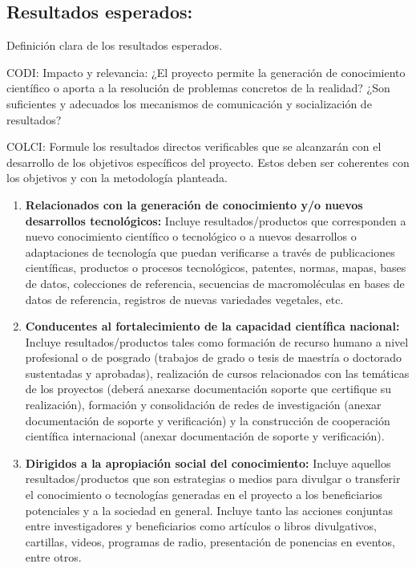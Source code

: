 \subsection{Resultados esperados:                          }
\begin{evaluacion}
  Definición clara de los resultados esperados.
\end{evaluacion}
\begin{instrucciones}
CODI:  Impacto y relevancia:
¿El proyecto permite la generación de conocimiento científico o aporta a la resolución de problemas concretos de la realidad? ¿Son suficientes y adecuados los mecanismos de comunicación y socialización de resultados? 

 COLCI: Formule los resultados directos verificables que se
alcanzarán con el desarrollo de los objetivos específicos del proyecto. Estos deben ser coherentes
con los objetivos y con la metodología planteada.



  \begin{enumerate}
  \item \textbf{Relacionados con la generación de conocimiento y/o nuevos desarrollos
 tecnológicos:} Incluye resultados/productos que corresponden a nuevo
 conocimiento científico o tecnológico o a nuevos desarrollos o adaptaciones de
 tecnología que puedan verificarse a través de publicaciones científicas,
 productos o procesos tecnológicos, patentes, normas, mapas, bases de datos,
 colecciones de referencia, secuencias de macromoléculas en bases de datos de
 referencia, registros de nuevas variedades vegetales, etc.
\item \textbf{Conducentes al fortalecimiento de la capacidad científica
  nacional:} Incluye resultados/productos tales como formación de
  recurso humano a nivel profesional o de posgrado (trabajos de grado
  o tesis de maestría o doctorado sustentadas y aprobadas),
  realización de cursos relacionados con las temáticas de los
  proyectos (deberá anexarse documentación soporte que certifique su
  realización), formación y consolidación de redes de investigación
  (anexar documentación de soporte y verificación) y la construcción
  de cooperación científica internacional (anexar documentación de
  soporte y verificación).
\item \textbf{Dirigidos a la apropiación social del conocimiento:}
  Incluye aquellos resultados/productos que son estrategias o medios
  para divulgar o transferir el conocimiento o tecnologías generadas
  en el proyecto a los beneficiarios potenciales y a la sociedad en
  general. Incluye tanto las acciones conjuntas entre investigadores y
  beneficiarios como artículos o libros divulgativos, cartillas,
  videos, programas de radio, presentación de ponencias en eventos,
  entre otros.
  \end{enumerate}


\end{instrucciones}
